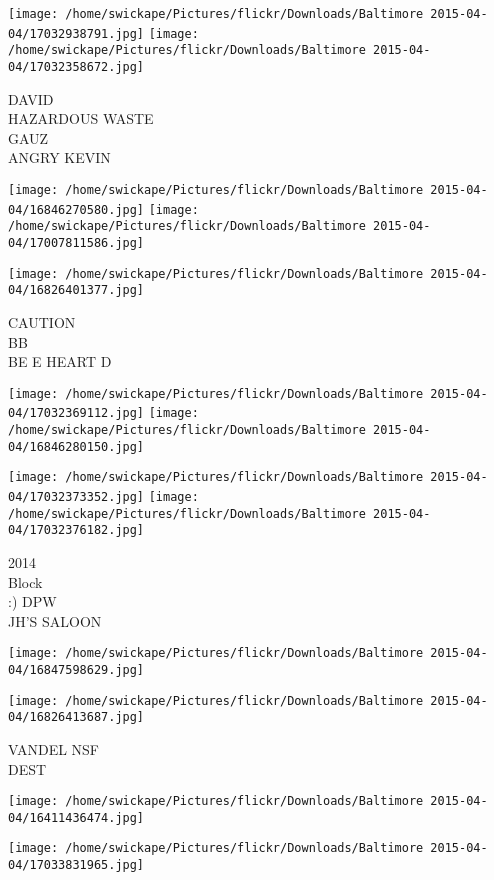 \documentclass[10pt,letterpaper]{article}
\begin{document}
\texttt{[image: /home/swickape/Pictures/flickr/Downloads/Baltimore 2015-04-04/17032938791.jpg]}
\texttt{[image: /home/swickape/Pictures/flickr/Downloads/Baltimore 2015-04-04/17032358672.jpg]}

DAVID\\
HAZARDOUS WASTE\\
GAUZ\\
ANGRY KEVIN
\pagebreak

\texttt{[image: /home/swickape/Pictures/flickr/Downloads/Baltimore 2015-04-04/16846270580.jpg]}
\texttt{[image: /home/swickape/Pictures/flickr/Downloads/Baltimore 2015-04-04/17007811586.jpg]}

\vspace{0.25in}
\texttt{[image: /home/swickape/Pictures/flickr/Downloads/Baltimore 2015-04-04/16826401377.jpg]}

CAUTION\\
BB\\
BE E HEART D
\pagebreak

\texttt{[image: /home/swickape/Pictures/flickr/Downloads/Baltimore 2015-04-04/17032369112.jpg]}
\texttt{[image: /home/swickape/Pictures/flickr/Downloads/Baltimore 2015-04-04/16846280150.jpg]}

\texttt{[image: /home/swickape/Pictures/flickr/Downloads/Baltimore 2015-04-04/17032373352.jpg]}
\texttt{[image: /home/swickape/Pictures/flickr/Downloads/Baltimore 2015-04-04/17032376182.jpg]}

2014\\
Block\\
:) DPW\\
JH'S SALOON
\pagebreak

\texttt{[image: /home/swickape/Pictures/flickr/Downloads/Baltimore 2015-04-04/16847598629.jpg]}

\vspace{0.25in}
\texttt{[image: /home/swickape/Pictures/flickr/Downloads/Baltimore 2015-04-04/16826413687.jpg]}

VANDEL NSF\\
DEST
\pagebreak

\texttt{[image: /home/swickape/Pictures/flickr/Downloads/Baltimore 2015-04-04/16411436474.jpg]}

\vspace{0.25in}
\texttt{[image: /home/swickape/Pictures/flickr/Downloads/Baltimore 2015-04-04/17033831965.jpg]}
\end{document}
